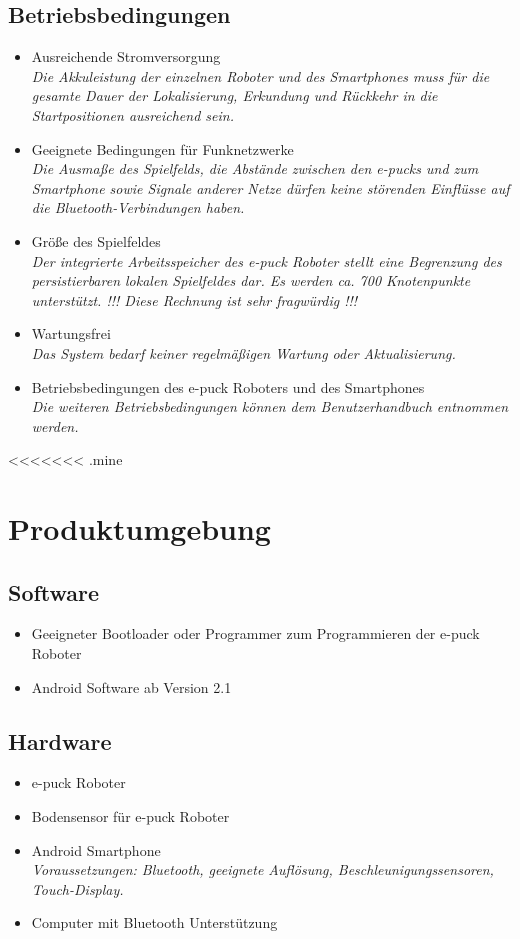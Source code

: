\documentclass[10pt,a4paper]{article}
\begin{document}
		\subsection{Betriebsbedingungen}
			\begin{itemize}
				\item Ausreichende Stromversorgung
					\\ \textsl{Die Akkuleistung der einzelnen Roboter und des Smartphones muss für die gesamte
						Dauer der Lokalisierung, Erkundung und Rückkehr in die Startpositionen ausreichend sein.}
				\item Geeignete Bedingungen für Funknetzwerke
					\\ \textsl{Die Ausmaße des Spielfelds, die Abstände zwischen den e-pucks und zum Smartphone sowie
						Signale anderer Netze dürfen keine störenden Einflüsse auf die Bluetooth-Verbindungen haben.}
				\item Größe des Spielfeldes
					\\ \textsl{Der integrierte Arbeitsspeicher des e-puck Roboter stellt eine Begrenzung des 
					 persistierbaren lokalen Spielfeldes dar. Es werden ca. 700 Knotenpunkte unterstützt. 
					 !!! Diese Rechnung ist sehr fragwürdig !!!}			
				\item Wartungsfrei
					\\ \textsl{Das System bedarf keiner regelmäßigen Wartung oder Aktualisierung.}		
				\item Betriebsbedingungen des e-puck Roboters und des Smartphones
					\\ \textsl{Die weiteren Betriebsbedingungen können dem Benutzerhandbuch entnommen werden.}
			\end{itemize}
<<<<<<< .mine
		\section{Produktumgebung}
			\subsection{Software}
				\begin{itemize}
					\item Geeigneter Bootloader oder Programmer zum Programmieren der e-puck Roboter
					\item Android Software ab Version 2.1
				\end{itemize}
			\subsection{Hardware}
				\begin{itemize}
					\item e-puck Roboter
					\item Bodensensor für e-puck Roboter
					\item Android Smartphone
						\\ \textsl{Voraussetzungen: Bluetooth, geeignete Auflösung, Beschleunigungssensoren, Touch-Display.}
					\item Computer mit Bluetooth Unterstützung
				\end{itemize}		
\end{document}
